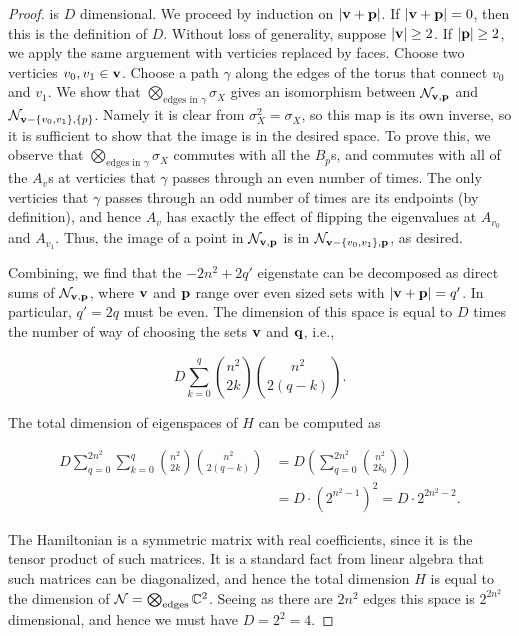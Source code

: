 \documentclass{article}
\theoremstyle{definition}
\numberwithin{figure}{section}
\begin{document}
\begin{proof}
is $D$ dimensional. We proceed by induction on $|\bold{v}+\bold{p}|$. If $|\bold{v}+\bold{p}|=0$, then this is the definition of $D$. Without loss of generality, suppose $|\bold{v}|\geq 2$. If $|\bold{p}|\geq 2$, we apply the same arguement with verticies replaced by faces. Choose two verticies $v_0,v_1\in \bold{v}$. Choose a path $\gamma$ along the edges of the torus that connect $v_0$ and $v_1$. We show that $\bigotimes_{\text{edges in }\gamma}\sigma_X$ gives an isomorphism between $\mathcal{N}_{\bold{v},\bold{p}}$ and $\mathcal{N}_{\bold{v}-\{v_0,v_1\},\{p\}}$. Namely it is clear from $\sigma_X^2=\sigma_X$, so this map is its own inverse, so it is sufficient to show that the image is in the desired space. To prove this, we observe that $\bigotimes_{\text{edges in }\gamma}\sigma_X$ commutes with all the $B_p$s, and commutes with all of the $A_v$s at verticies that $\gamma$ passes through an even number of times. The only verticies that $\gamma$ passes through an odd number of times are its endpoints (by definition), and hence $A_v$ has exactly the effect of flipping the eigenvalues at $A_{v_0}$ and $A_{v_1}$. Thus, the image of a point in $\mathcal{N}_{\bold{v},\bold{p}}$ is in $\mathcal{N}_{\bold{v}-\{v_0,v_1\},\bold{p}}$, as desired.

Combining, we find that the $-2n^2+2q'$ eigenstate can be decomposed as direct sums of $\mathcal{N}_{\bold{v},\bold{p}}$, where $\bold{v}$ and $\bold{p}$ range over even sized sets with $|\bold{v}+\bold{p}|=q'$. In particular, $q'=2q$ must be even. The dimension of this space is equal to $D$ times the number of way of choosing the sets $\bold{v}$ and $\bold{q}$, i.e.,

$$D\sum_{k=0}^{q}{n^2 \choose 2k}{n^2 \choose 2(q-k)}.$$

The total dimension of eigenspaces of $H$ can be computed as

\begin{align*}
D\sum_{q=0}^{2n^2}\sum_{k=0}^{q}{n^2 \choose 2k}{n^2 \choose 2(q-k)}&=D\left(\sum_{q=0}^{2n^2}{n^2 \choose 2k_0}\right)\\
&=D\cdot \left(2^{n^2-1}\right)^2=D\cdot 2^{2n^2-2}.
\end{align*}

The Hamiltonian is a symmetric matrix with real coefficients, since it is the tensor product of such matrices. It is a standard fact from linear algebra that such matrices can be diagonalized, and hence the total dimension $H$ is equal to the dimension of $\mathcal{N}=\bigotimes_{\text{edges}}\mathbb{C}^2$. Seeing as there are $2n^2$ edges this space is $2^{2n^2}$ dimensional, and hence we must have $D=2^2=4$.
\end{proof}
\end{document}
